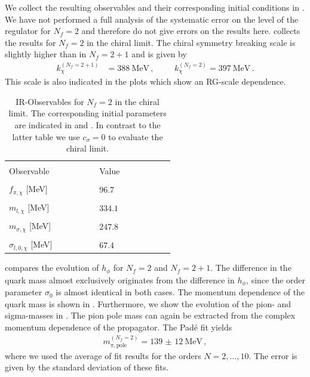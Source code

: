 \documentclass[aps,twocolumn,prd,superscriptaddress]{revtex4-2}
\begin{document}
We collect the resulting observables and their corresponding initial conditions in . 
We have not performed a full analysis of the systematic error on the level of the regulator for $N_f=2$ and therefore do not give errors on the results here.
 collects the results for $N_f=2$ in the chiral limit. The chiral symmetry breaking scale is slightly higher than in $N_f =2+1$ and is given by
%
\begin{align}
	k_\chi^{(N_f=2+1)} & = \qty{388}{\MeV}\,,\hspace{1cm}
	k_\chi^{(N_f=2)}    = \qty{397}{\MeV}\,.
	\label{eq:ChiralSymmbScale2}
\end{align}
%
This scale is also indicated in the plots which show an RG-scale dependence.
%
\begin{table}[b]\centering
	\begin{tabular}{|>{\centering}m{0.3\linewidth} | >{\centering\arraybackslash}m{0.25\linewidth} |}
		\hline & \\[-1ex]
		Observable & Value \\[0.5ex]
		\hline& \\[-1.5ex]
		$f_{\pi,\chi}$ [MeV] & $96.7$ 	\\[1ex]
		\hline& \\[-1.5ex]
		$m_{l,\chi}$ [MeV]  & $334.1$	\\[1ex]
		\hline& \\[-1.5ex]
		$m_{\sigma,\chi}$ [MeV]  & $247.8$	\\[1ex]
		\hline& \\[-1.5ex]
		$\sigma_{l,0,\chi}$ [MeV] & $67.4$	\\[1ex]
		\hline
	\end{tabular}
	\caption{IR-Observables for $N_f = 2$ in the chiral limit. The corresponding initial parameters are indicated in  and . In contrast to the latter table we use $c_\sigma =0$ to evaluate the chiral limit.
		\hspace*{\fill}	\label{tab:resultsChiralNf2} }
\end{table}
%
 compares the evolution of $h_\phi$ for $N_f=2$ and $N_f=2+1$. The difference in the quark mass almost exclusively originates from the difference in $h_\phi$, since the order parameter $\sigma_0$ is almost identical in both cases. The momentum dependence of the quark mass is shown in .
Furthermore, we show the evolution of the pion- and sigma-masses in .
The pion pole mass can again be extracted from the complex momentum dependence of the propagator. The Padé fit yields
%
\begin{align}
	m^{(N_f=2)}_{\pi,\textrm{pole}}	= \qty{139(12)}{\MeV}\,,
\end{align}
%
where we used the average of fit results for the orders $N=2,\dotsc,10$. The error is given by the standard deviation of these fits.
\end{document}
